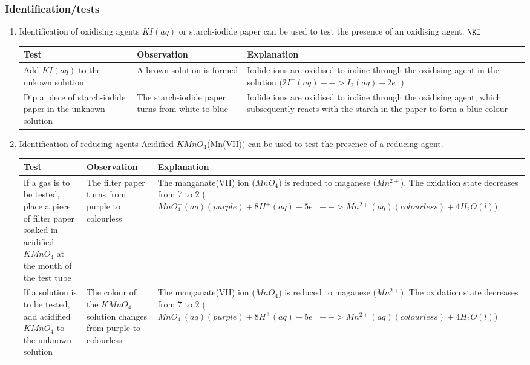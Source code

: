 \documentclass[11pt]{article}
\begin{document}
\subsubsection{Identification/tests}
\label{sec:org969f43e}
\begin{enumerate}
\item Identification of oxidising agents
\label{sec:orgb979437}
\(KI(aq)\) or starch-iodide paper can be used to test the presence of an oxidising agent. \(\KI\)
\begin{center}
\begin{tabular}{lll}
Test & Observation & Explanation\\
\hline
Add \(KI(aq)\) to the unkown solution & A brown solution is formed & Iodide ions are oxidised to iodine through the oxidising agent in the solution (\(2I^-(aq) --> I_2(aq) + 2e^-\))\\
Dip a piece of starch-iodide paper in the unknown solution & The starch-iodide paper turns from white to blue & Iodide ions are oxidised to iodine through the oxidising agent, which subsequently reacts with the starch in the paper to form a blue colour\\
\end{tabular}
\end{center}
\item Identification of reducing agents
\label{sec:org07df8c8}
Acidified \(KMnO_4\)(Mn(VII)) can be used to test the presence of a reducing agent.
\begin{center}
\begin{tabular}{lll}
Test & Observation & Explanation\\
\hline
If a gas is to be tested, place a piece of filter paper soaked in acidified \(KMnO_4\) at the mouth of the test tube & The filter paper turns from purple to colourless & The manganate(VII) ion (\(MnO_4\)) is reduced to maganese (\(Mn^{2+}\)). The oxidation state decreases from 7 to 2 (\(MnO_4^-(aq)(purple)+8H^+(aq)+5e^--->Mn^{2+}(aq)(colourless) + 4H_2O(l)\))\\
If a solution is to be tested, add acidified \(KMnO_4\) to the unknown solution & The colour of the \(KMnO_4\) solution changes from purple to colourless & The manganate(VII) ion (\(MnO_4\)) is reduced to maganese (\(Mn^{2+}\)). The oxidation state decreases from 7 to 2 (\(MnO_4^-(aq)(purple)+8H^+(aq)+5e^--->Mn^{2+}(aq)(colourless) + 4H_2O(l)\))\\
\end{tabular}
\end{center}
\end{enumerate}
\end{document}
